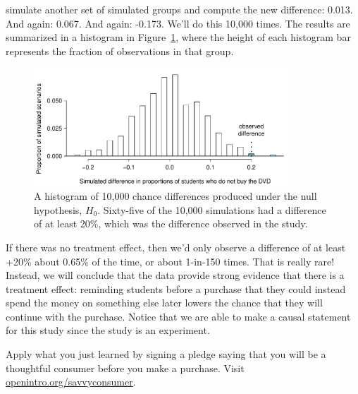  simulate another set of simulated groups and compute the new difference: 0.013. And again: 0.067. And again: -0.173. We'll do this 10,000 times. The results are summarized in a histogram in Figure~\ref{OpportunityCostDiffs}, where the height of each histogram bar represents the fraction of observations in that group.

\begin{figure}[ht]
\centering
\includegraphics[width=0.85\textwidth]{02/figures/OpportunityCost/OpportunityCostDiffsRightTail}
\caption{A histogram of 10,000 chance differences produced under the null hypothesis, $H_0$. Sixty-five of the 10,000 simulations had a difference of at least 20\%, which was the difference observed in the study.}
\label{OpportunityCostDiffs}
\end{figure}

If there was no treatment effect, then we'd only observe a difference of at least +20\% about 0.65\% of the time, or about 1-in-150 times. That is really rare! Instead, we will conclude that the data provide strong evidence that there is a treatment effect: reminding students before a purchase that they could instead spend the money on something else later lowers the chance that they will continue with the purchase. Notice that we are able to make a causal statement for this study since the study is an experiment.

\begin{termBox}{
Apply what you just learned by signing a pledge saying that you will be a thoughtful consumer before you make a purchase. Visit \href{http://www.openintro.org/savvyconsumer}{openintro.org/savvyconsumer}.}
\end{termBox}




